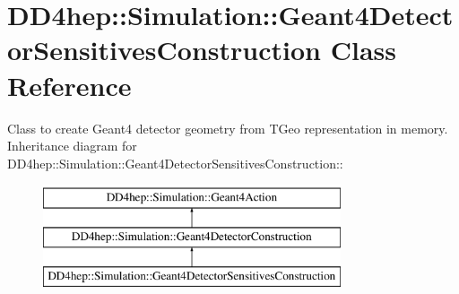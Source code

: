 \hypertarget{class_d_d4hep_1_1_simulation_1_1_geant4_detector_sensitives_construction}{
\section{DD4hep::Simulation::Geant4DetectorSensitivesConstruction Class Reference}
\label{class_d_d4hep_1_1_simulation_1_1_geant4_detector_sensitives_construction}
}


Class to create Geant4 detector geometry from TGeo representation in memory.  
Inheritance diagram for DD4hep::Simulation::Geant4DetectorSensitivesConstruction::\begin{figure}[H]
\begin{center}
\leavevmode
\includegraphics[height=3cm]{class_d_d4hep_1_1_simulation_1_1_geant4_detector_sensitives_construction}
\end{center}
\end{figure}
